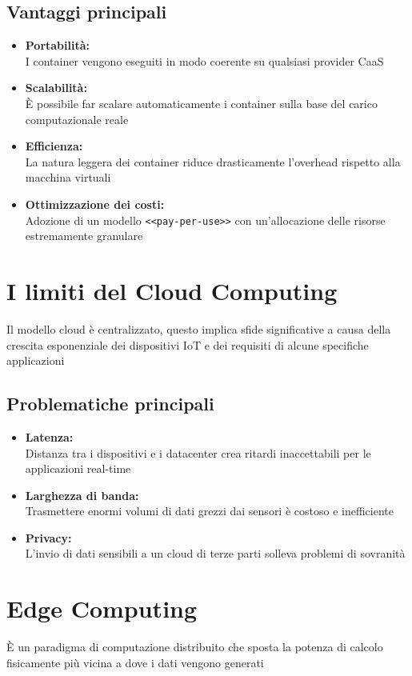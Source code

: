 \subsection{Vantaggi principali}
\begin{itemize}
    \item \textbf{Portabilità:}\\
    I container vengono eseguiti in modo coerente su qualsiasi provider CaaS
    \item \textbf{Scalabilità:}\\
    È possibile far scalare automaticamente i container sulla base del carico computazionale reale
    \item \textbf{Efficienza:}\\
    La natura leggera dei container riduce drasticamente l'overhead rispetto alla macchina virtuali
    \item \textbf{Ottimizzazione dei costi:}\\
    Adozione di un modello \texttt{<<pay-per-use>>} con un'allocazione delle risorse estremamente granulare
\end{itemize}

\section{I limiti del Cloud Computing}
Il modello cloud è centralizzato, questo implica sfide significative a causa della crescita esponenziale dei dispositivi IoT e dei requisiti di alcune specifiche applicazioni 

\subsection{Problematiche principali}
\begin{itemize}
    \item \textbf{Latenza:}\\
    Distanza tra i dispositivi e i datacenter crea ritardi inaccettabili per le applicazioni real-time
    \item \textbf{Larghezza di banda:}\\
    Trasmettere enormi volumi di dati grezzi dai sensori è costoso e inefficiente
    \item \textbf{Privacy:}\\
    L'invio di dati sensibili a un cloud di terze parti solleva problemi di sovranità
\end{itemize}

\section{Edge Computing}
È un paradigma di computazione distribuito che sposta la potenza di calcolo fisicamente più vicina a dove i dati vengono generati

